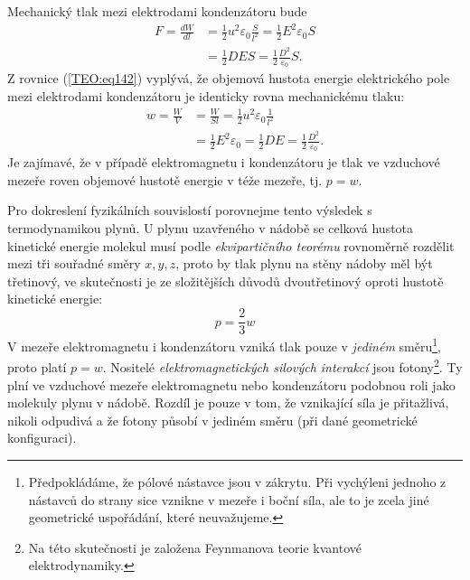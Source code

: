       Mechanický tlak mezi elektrodami kondenzátoru bude
      \begin{align*}
        F  = \frac{dW}{dl} 
          &= \frac{1}{2}u^2\varepsilon_0\frac{S}{l^2}
           = \frac{1}{2}E^2\varepsilon_0S                                  \\
          &= \frac{1}{2}DES          
           = \frac{1}{2}\frac{D^2}{\varepsilon_0}S.
      \end{align*}
      Z rovnice (\ref{TEO:eq142}) vyplývá, že objemová hustota energie elektrického pole mezi
      elektrodami kondenzátoru je identicky rovna mechanickému tlaku:
      \begin{align*}
        w  = \frac{W}{V} 
          &= \frac{W}{Sl} 
           = \frac{1}{2}u^2\varepsilon_0\frac{1}{l^2}          \\
          &= \frac{1}{2}E^2\varepsilon_0 = \frac{1}{2}DE 
           = \frac{1}{2}\frac{D^2}{\varepsilon_0}.
      \end{align*}
      Je zajímavé, že v případě elektromagnetu i kondenzátoru je tlak ve vzduchové mezeře roven
      objemové hustotě energie v téže mezeře, tj. \(p = w\).
      
      Pro dokreslení fyzikálních souvislostí porovnejme tento výsledek s termodynamikou plynů. U 
      plynu uzavřeného v nádobě se celková hustota kinetické energie molekul musí podle
      \emph{ekvipartičního teorému} rovnoměrně rozdělit mezi tři souřadné směry \(x, y, z\), proto 
      by tlak plynu na stěny nádoby měl být třetinový, ve skutečnosti je ze složitějších důvodů 
      dvoutřetinový oproti hustotě kinetické energie:
      \begin{equation*}
        p = \frac{2}{3}w
      \end{equation*}
      V mezeře elektromagnetu i kondenzátoru vzniká tlak pouze v \emph{jediném} 
      směru\footnote{Předpokládáme, že pólové nástavce jsou v zákrytu. Při vychýleni jednoho z 
      nástavců do strany sice vznikne v mezeře i boční síla, ale to je zcela jiné geometrické 
      uspořádání, které neuvažujeme.}, proto platí \(p = w\). Nositelé \emph{elektromagnetických 
      silových interakcí} jsou fotony\footnote{Na této skutečnosti je založena Feynmanova teorie
      kvantové elektrodynamiky.}. Ty plní ve vzduchové mezeře elektromagnetu nebo kondenzátoru
      podobnou roli jako molekuly plynu v nádobě. Rozdíl je pouze v tom, že vznikající síla je
      přitažlivá, nikoli odpudivá a že fotony působí v jediném směru (při dané geometrické
      konfiguraci).
      
